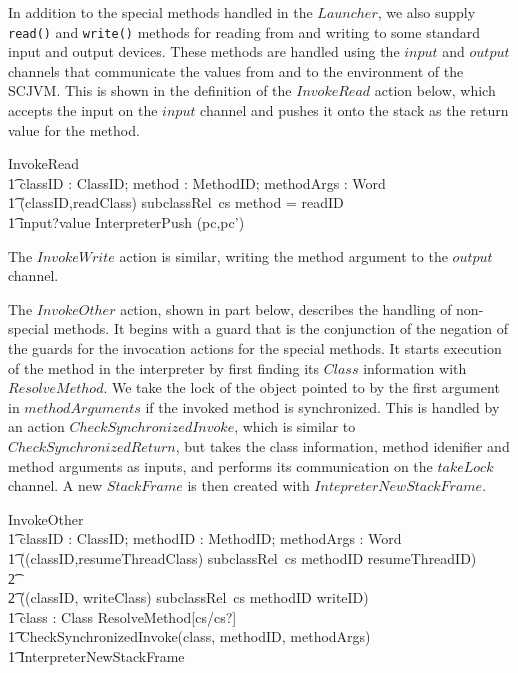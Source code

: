 In addition to the special methods handled in the $Launcher$, we also
supply \texttt{read()} and \texttt{write()} methods for reading from
and writing to some standard input and output devices. 
These methods are handled using the $input$ and $output$
channels that communicate the values from and to the environment of
the SCJVM.
This is shown in the definition of the $InvokeRead$ action below,
which accepts the input on the $input$ channel and pushes it onto the
stack as the return value for the method.
\begin{circusaction}
  InvokeRead \circdef \\
  \t1 \circval classID : ClassID; \circval method : MethodID; \circval methodArgs : \seq Word \circspot \\
  \t1 \lcircguard (classID,readClass) \in subclassRel~cs \land method = readID \rcircguard \circguard {} \\
  \t1 input?value \then \lschexpract InterpreterPush \hide (pc,pc') \rschexpract
\end{circusaction}
The $InvokeWrite$ action is similar, writing the method argument to
the $output$ channel.

The $InvokeOther$ action, shown in part below, describes the handling
of non-special methods.
It begins with a guard that is the conjunction of the negation of the
guards for the invocation actions for the special methods.
It starts execution of the method in the interpreter by first finding
its $Class$ information with $ResolveMethod$.
We take the lock of the object pointed to by the first argument in
$methodArguments$ if the invoked method is synchronized.
This is handled by an action $CheckSynchronizedInvoke$, which is
similar to $CheckSynchronizedReturn$, but takes the class information,
method idenifier and method arguments as inputs, and performs its
communication on the $takeLock$ channel. 
A new $StackFrame$ is then created with $IntepreterNewStackFrame$.
\begin{circusaction}
  InvokeOther \circdef \\
  \t1 \circval classID : ClassID; \circval methodID : MethodID; \circval methodArgs : \seq Word \circspot \\
  \t1 \lcircguard ((classID,resumeThreadClass) \notin subclassRel~cs \lor methodID \neq resumeThreadID) \\
  \t2 {} \land \cdots \\
  \t2 {} \land ((classID, writeClass) \notin subclassRel~cs \lor methodID \neq writeID) \rcircguard \circguard {} \\
  \t1 \circvar class : Class \circspot \lschexpract ResolveMethod[cs/cs?] \rschexpract \circseq \\
  \t1 CheckSynchronizedInvoke(class, methodID, methodArgs) \circseq \\
  \t1 \lschexpract InterpreterNewStackFrame \rschexpract
\end{circusaction}

